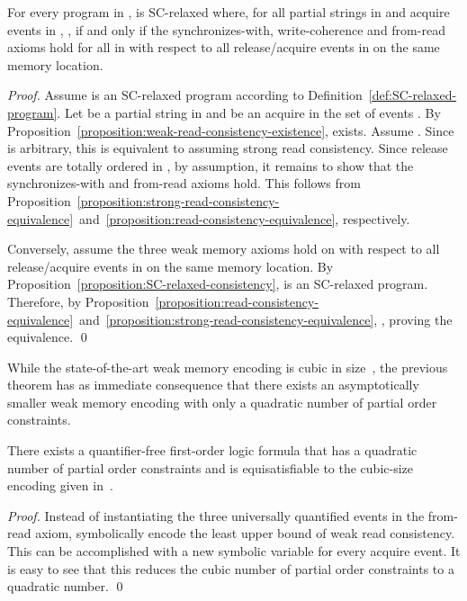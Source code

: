 \documentclass{llncs}
\begin{document}
\begin{theorem}
\label{theorem:SC-relaxed-equivalence}
For every program  in ,  is SC-relaxed where, for all partial strings  in  and acquire events  in , , if and only if the synchronizes-with, write-coherence and from-read axioms hold for all  in  with respect to all release/acquire events in  on the same memory location.
\end{theorem}
\begin{proof}
Assume  is an SC-relaxed program according to Definition~\ref{def:SC-relaxed-program}. Let  be a partial string in  and  be an acquire in the set of events . By Proposition~\ref{proposition:weak-read-consistency-existence},  exists. Assume . Since  is arbitrary, this is equivalent to assuming strong read consistency. Since release events are totally ordered in , by assumption, it remains to show that the synchronizes-with and from-read axioms hold. This follows from Proposition~\ref{proposition:strong-read-consistency-equivalence}~and~\ref{proposition:read-consistency-equivalence}, respectively.

Conversely, assume the three weak memory axioms hold on  with respect to all release/acquire events in  on the same memory location. By Proposition~\ref{proposition:SC-relaxed-consistency},  is an SC-relaxed program. Therefore, by Proposition~\ref{proposition:read-consistency-equivalence}~and~\ref{proposition:strong-read-consistency-equivalence}, , proving the equivalence. \qed
\end{proof}

While the state-of-the-art weak memory encoding is cubic in size~\cite{AKT2013}, the previous theorem has as immediate consequence that there exists an asymptotically smaller weak memory encoding with only a quadratic number of partial order constraints.

\begin{theorem}
\label{theorem:smaller-fr}
There exists a quantifier-free first-order logic formula that has a quadratic number of partial order constraints and is equisatisfiable to the cubic-size encoding given in~\cite{AKT2013}.
\end{theorem}

\begin{proof}
Instead of instantiating the three universally quantified events in the from-read axiom, symbolically encode the least upper bound of weak read consistency. This can be accomplished with a new symbolic variable for every acquire event. It is easy to see that this reduces the cubic number of partial order constraints to a quadratic number. \qed
\end{proof}
\end{document}
